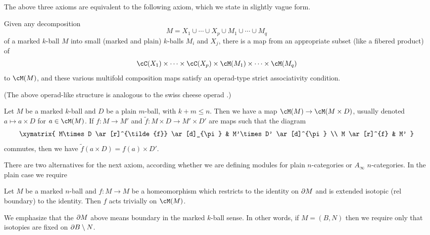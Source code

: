 The above three axioms are equivalent to the following axiom,
which we state in slightly vague form.

{Given any decomposition 
\[
	M =  X_1 \cup\cdots\cup X_p \cup M_1\cup\cdots\cup M_q
\]
of a marked $k$-ball $M$
into small (marked and plain) $k$-balls $M_i$ and $X_j$, there is a 
map from an appropriate subset (like a fibered product) 
of 
\[
	\cC(X_1)\times\cdots\times\cC(X_p) \times \cM(M_1)\times\cdots\times\cM(M_q) 
\]
to $\cM(M)$,
and these various multifold composition maps satisfy an
operad-type strict associativity condition.}

(The above operad-like structure is analogous to the swiss cheese operad
\cite{MR1718089}.)

\begin{module-axiom}
{Let $M$ be a marked $k$-ball and $D$ be a plain $m$-ball, with $k+m \le n$.
Then we have a map $\cM(M)\to \cM(M\times D)$, usually denoted $a\mapsto a\times D$ for $a\in \cM(M)$.
If $f:M\to M'$ and $\tilde{f}:M\times D \to M'\times D'$ are maps such that the diagram
\[ \xymatrix{
	M\times D \ar[r]^{\tilde{f}} \ar[d]_{\pi} & M'\times D' \ar[d]^{\pi} \\
	M \ar[r]^{f} & M'
} \]
commutes, then we have $\tilde{f}(a\times D) = f(a)\times D'$.}
\end{module-axiom}



There are two alternatives for the next axiom, according whether we are defining
modules for plain $n$-categories or $A_\infty$ $n$-categories.
In the plain case we require

\begin{module-axiom}
{Let $M$ be a marked $n$-ball and $f: M\to M$ be a homeomorphism which restricts
to the identity on $\partial M$ and is extended isotopic (rel boundary) to the identity.
Then $f$ acts trivially on $\cM(M)$.}
\end{module-axiom}


We emphasize that the $\partial M$ above means boundary in the marked $k$-ball sense.
In other words, if $M = (B, N)$ then we require only that isotopies are fixed 
on $\partial B \setminus N$.

